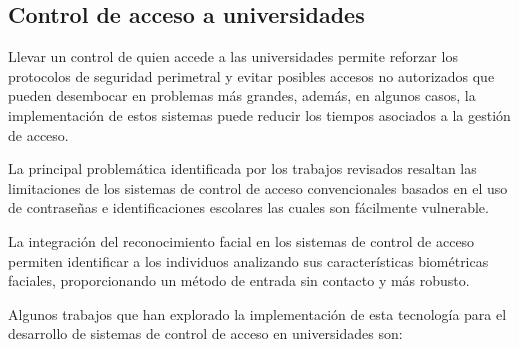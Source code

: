 \subsection{Control de acceso a universidades}

Llevar un control de quien accede a las universidades permite reforzar los protocolos de seguridad perimetral y evitar posibles accesos no autorizados que pueden desembocar en problemas más grandes, además, en algunos casos, la implementación de estos sistemas puede reducir los tiempos asociados a la gestión de acceso.

La principal problemática identificada por los trabajos revisados resaltan las limitaciones de los sistemas de control de acceso convencionales basados en el uso de contraseñas e identificaciones escolares las cuales son fácilmente vulnerable.

La integración del reconocimiento facial en los sistemas de control de acceso permiten identificar a los individuos analizando sus características biométricas faciales, proporcionando un método de entrada sin contacto y más robusto.

Algunos trabajos que han explorado la implementación de esta tecnología para el desarrollo de sistemas de control de acceso en universidades son:

